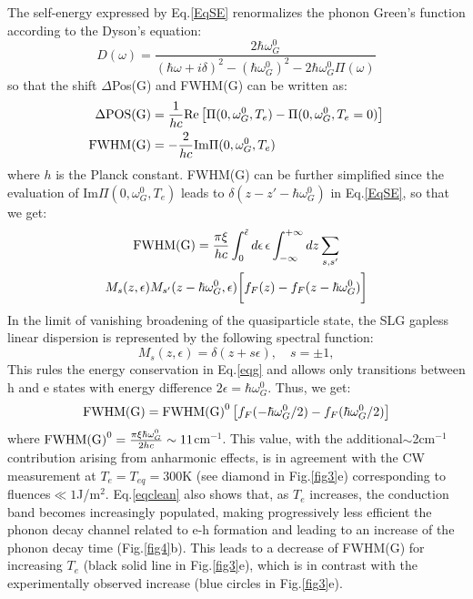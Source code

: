 \documentclass[aps, prl,twocolumn]{revtex4}
\begin{document}
The self-energy expressed by Eq.\ref{EqSE} renormalizes the phonon Green's function according to the Dyson's equation\cite{Ando2006}:
\begin{equation}
D(\omega)=\frac{2\hbar\omega_G^0}{(\hbar\omega+i\delta)^2-(\hbar\omega_G^0)^2-2\hbar\omega_G^0\Pi(\omega)}
\end{equation}
so that the shift $\Delta$Pos(G) and FWHM(G) can be written as:
\begin{equation}
\begin{split}
\Delta \textnormal{POS(G)}&=\frac{1}{h c}\mathrm{Re} \left[\Pi(0,\omega_G^0,T_e)-\Pi(0,\omega_G^0,T_e=0)\right]\\
\textnormal{FWHM(G)}&=-\frac{2}{h c}\mathrm{Im}\Pi(0,\omega_G^0,T_e)
\end{split}
\end{equation}
where $h$ is the Planck constant.
FWHM(G) can be further simplified since the evaluation of $\mathrm{Im}\Pi(0,\omega_G^0,T_e)$ leads to $\delta(z-z'-\hbar\omega_G^0)$ in Eq.\ref{EqSE}, so that we get:
\begin{multline}
\textnormal{FWHM(G)}=\frac{\pi\xi}{h c}  \int_{0}^{\tilde\epsilon} d\epsilon \, \epsilon  \int_{-\infty}^{+\infty} dz\sum_{s,s'}\\ M_s(z,\epsilon)M_{s'}(z-\hbar\omega_G^0,\epsilon) \bigg[f_F(z)-f_F(z-\hbar\omega_G^0)\bigg]
\label{eqg}
\end{multline}
In the limit of vanishing broadening of the quasiparticle state, the SLG gapless linear dispersion is represented by the following spectral function\cite{Ando2006}:
\begin{equation}
\label{ms}
M_s(z,\epsilon)=\delta(z+s\epsilon), \quad s=\pm1,
\end{equation}
This rules the energy conservation in Eq.\ref{eqg} and allows only transitions between h and e states with energy difference $2\epsilon=\hbar\omega_G^0$. Thus, we get\cite{Piscanec2004, LazzeriPRL06, Pisana2007}:
\begin{multline}
\label{eqclean}
\textnormal{FWHM(G)}=\textnormal{FWHM(G)}^0 \left[f_F(-\hbar\omega_G^0/2) -f_F(\hbar\omega_G^0/2)\right]
\end{multline}
where $\textnormal{FWHM(G)}^0=\frac{\pi \xi \hbar \omega_G^0}{2 h c}\sim11$cm$^{-1}$\cite{Bonini2007}. This value, with the additional$\sim$2cm$^{-1}$ contribution arising from anharmonic effects\cite{Bonini2007}, is in agreement with the CW measurement at $T_e=T_{eq}=300$K (see diamond in Fig.\ref{fig3}e) corresponding to fluences$\ll 1$J/m$^2$. Eq.\ref{eqclean} also shows that, as $T_e$ increases, the conduction band becomes increasingly populated, making progressively less efficient the phonon decay channel related to e-h formation and leading to an increase of the phonon decay time (Fig.\ref{fig4}b). This leads to a decrease of FWHM(G) for increasing $T_e$ (black solid line in Fig.\ref{fig3}e), which is in contrast with the experimentally observed increase (blue circles in Fig.\ref{fig3}e).
\end{document}
